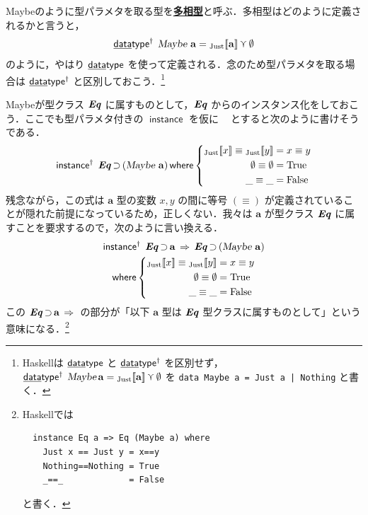 \documentclass[a5paper,twoside,fleqn,draft]{jsbook}
\def\[{[\![}
\def\]{]\!]}
\newcommand{\programminglanguage}[1]{\textsf{#1}}
\newcommand{\haskell}{\programminglanguage{Haskell}}
\newcommand{\keyword}[1]{{\underline{\textbf{#1}}}}
\newcommand{\code}[1]{\texttt{#1}}
\newcommand{\mKeyword}[1]{\mathsf{#1}}
\newcommand{\mKeywordUnderline}[1]{\text{\underline{\textsf{#1}}}}
\newcommand{\mDataTypeKeyword}{\mKeywordUnderline{data}\mKeyword{type}}
\newcommand{\mInstanceDeclKeyword}{\mKeyword{instance}}
\newcommand{\mWhereKeyword}{\mKeyword{where}}
\newcommand{\mPolymorphic}[1]{{#1}^\dagger}
\DeclareMathOperator{\mDataType}{\mDataTypeKeyword}
\DeclareMathOperator{\mDataTypePolymorphic}{\mDataTypeKeyword^\dagger}
\DeclareMathOperator{\mInstanceDecl}{\mInstanceDeclKeyword}
\DeclareMathOperator{\mInstanceDeclPolymorphic}{\mPolymorphic{\mInstanceDeclKeyword}}
\DeclareMathOperator{\mSuperClass}{\;\Rightarrow\;}
\DeclareMathOperator{\mSuperSet}{\supset}
\DeclareMathOperator{\mWhere}{\mWhereKeyword}
\newcommand{\mSpecialConstant}[1]{\textrm{#1}}
\newcommand{\mFalse}{\mSpecialConstant{False}}
\newcommand{\mNothing}{\emptyset}
\newcommand{\mTrue}{\mSpecialConstant{True}}
\DeclareMathOperator{\mValueOr}{\curlyvee}
\newcommand{\mType}[1]{\mathbf{#1}} %
\newcommand{\mA}{\mType{a}}
\newcommand{\mTypeAssemble}[2]{{}^\mathrm{#1}\[\mType{#2}\]}
\newcommand{\mMaybeType}[1]{\mTypeAssemble{Maybe}{#1}}
\newcommand{\mTypeConstructor}[1]{\textsl{#1}}
\DeclareMathOperator{\mMaybeTypeConstructor}{\mTypeConstructor{Maybe}}
\newcommand{\mValueConstructor}[1]{\mathrm{#1}}
\newcommand{\mValueWith}[2]{{}_\mValueConstructor{#1}\[#2\]}
\newcommand{\mJustWith}[1]{\mValueWith{Just}{#1}}
\newcommand{\mTypeClass}[1]{\textbf{\textit{#1}}}
\newcommand{\mEqTypeClass}{\mTypeClass{Eq}}
\begin{document}
Maybeのように型パラメタを取る型を\keyword{多相型}と呼ぶ．多相型はどのように定義されるかと言うと，
\begin{equation}
  \mDataTypePolymorphic\;
  \mMaybeTypeConstructor\,\mA
  =\mJustWith{\mA}\mValueOr\mNothing
\end{equation}
のように，やはり $\mDataType$ を使って定義される．念のため型パラメタを取る場合は $\mDataTypePolymorphic$ と区別しておこう．\footnote{\haskell は $\mDataType$ と $\mDataTypePolymorphic$ を区別せず，$\mDataTypePolymorphic\;\mMaybeTypeConstructor\mA=\mJustWith{\mA }\mValueOr\mNothing$ を \code{data Maybe a = Just a | Nothing} と書く．}

Maybeが型クラス $\mEqTypeClass$ に属すものとして，$\mEqTypeClass$ からのインスタンス化をしておこう．ここでも型パラメタ付きの $\mInstanceDecl$ を仮に $\mInstanceDeclPolymorphic$ とすると次のように書けそうである．
\begin{equation}
  \mInstanceDeclPolymorphic\;
  \mEqTypeClass\mSuperSet{}(\mMaybeTypeConstructor\,\mA)
  \mWhere
  \left\{
  \begin{aligned}
    \mJustWith{x}\equiv\mJustWith{y}
    &=x\equiv y\\
    \mNothing\equiv\mNothing
    &=\mTrue\\
    \_\equiv\_
    &=\mFalse
  \end{aligned}
  \right.
\end{equation}
残念ながら，この式は $\mA $ 型の変数 $x,y$ の間に等号 $(\equiv)$ が定義されていることが隠れた前提になっているため，正しくない．我々は $\mA $ が型クラス $\mEqTypeClass$ に属すことを要求するので，次のように言い換える．
\begin{multline}
\mInstanceDeclPolymorphic\;
\mEqTypeClass\mSuperSet\mA
\mSuperClass
\mEqTypeClass\mSuperSet{}(\mMaybeTypeConstructor\,\mA )\\
\mWhere
\left\{
\begin{aligned}
\mJustWith{x}\equiv\mJustWith{y}&=x\equiv y\\
\mNothing\equiv\mNothing&=\mTrue\\
\_\equiv\_&=\mFalse
\end{aligned}
\right.
\end{multline}
この $\mEqTypeClass\mSuperSet\mA \mSuperClass$ の部分が「以下 $\mA$ 型は $\mEqTypeClass$ 型クラスに属すものとして」という意味になる．\footnote{\haskell では
\begin{verbatim}
  instance Eq a => Eq (Maybe a) where
    Just x == Just y = x==y
    Nothing==Nothing = True
    _==_             = False
\end{verbatim}
と書く．}
\end{document}
